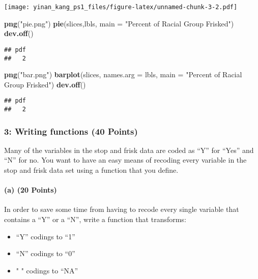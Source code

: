 \documentclass[]{article}
\newenvironment{Shaded}{\begin{snugshade}}{\end{snugshade}}
\newcommand{\DataTypeTok}[1]{\textcolor[rgb]{0.13,0.29,0.53}{#1}}
\newcommand{\KeywordTok}[1]{\textcolor[rgb]{0.13,0.29,0.53}{\textbf{#1}}}
\newcommand{\NormalTok}[1]{#1}
\newcommand{\StringTok}[1]{\textcolor[rgb]{0.31,0.60,0.02}{#1}}
\providecommand{\tightlist}{%
  \setlength{\itemsep}{0pt}\setlength{\parskip}{0pt}}
\let\oldparagraph\paragraph
\renewcommand{\paragraph}[1]{\oldparagraph{#1}\mbox{}}
\begin{document}
\texttt{[image: yinan\_kang\_ps1\_files/figure-latex/unnamed-chunk-3-2.pdf]}

\begin{Shaded}
\begin{Highlighting}[]
\KeywordTok{png}\NormalTok{(}\StringTok{"pie.png"}\NormalTok{)}
\KeywordTok{pie}\NormalTok{(slices,lbls, }\DataTypeTok{main =} \StringTok{"Percent of Racial Group Frisked"}\NormalTok{)}
\KeywordTok{dev.off}\NormalTok{() }
\end{Highlighting}
\end{Shaded}

\begin{verbatim}
## pdf 
##   2
\end{verbatim}

\begin{Shaded}
\begin{Highlighting}[]
\KeywordTok{png}\NormalTok{(}\StringTok{"bar.png"}\NormalTok{)}
\KeywordTok{barplot}\NormalTok{(slices, }\DataTypeTok{names.arg =}\NormalTok{ lbls, }\DataTypeTok{main =} \StringTok{"Percent of Racial Group Frisked"}\NormalTok{)}
\KeywordTok{dev.off}\NormalTok{() }
\end{Highlighting}
\end{Shaded}

\begin{verbatim}
## pdf 
##   2
\end{verbatim}

\hypertarget{writing-functions-40-points}{%
\subsubsection{3: Writing functions (40
Points)}\label{writing-functions-40-points}}

Many of the variables in the stop and frisk data are coded as ``Y'' for
``Yes'' and ``N'' for no. You want to have an easy means of recoding
every variable in the stop and frisk data set using a function that you
define.

\hypertarget{a-20-points}{%
\paragraph{(a) (20 Points)}\label{a-20-points}}

In order to save some time from having to recode every single variable
that contains a ``Y'' or a ``N'', write a function that transforms:

\begin{itemize}
\tightlist
\item
  ``Y'' codings to ``1''
\item
  ``N'' codings to ``0''
\item
  " " codings to ``NA''
\end{itemize}
\end{document}
